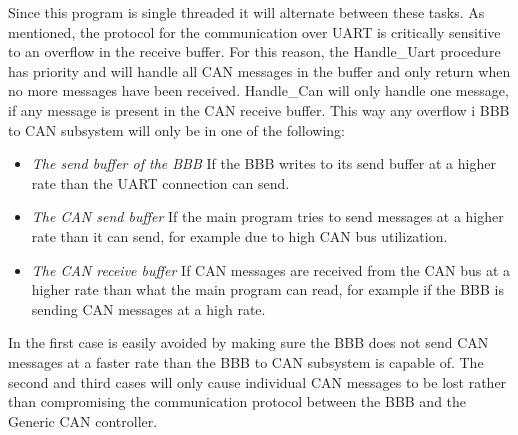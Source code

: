 Since this program is single threaded it will alternate between these tasks. \newline 
As mentioned, the protocol for the communication over UART is critically sensitive to an overflow in the receive buffer. For this reason, the Handle\_Uart procedure has priority and will handle all CAN messages in the buffer and only return when no more messages have been received. Handle\_Can will only handle one message, if any message is present in the CAN receive buffer. \newline
This way any overflow i BBB to CAN subsystem will only be in one of the following:

\begin{itemize}
   \item { \em The send buffer of the BBB} \newline
   If the BBB writes to its send buffer at a higher rate than the UART connection can send.
   \item { \em The CAN send buffer} \newline
   If the main program tries to send messages at a higher rate than it can send, for example due to high CAN bus utilization.
   \item { \em The CAN receive buffer} \newline
   If CAN messages are received from the CAN bus at a higher rate than what the main program can read, for example if the   BBB is sending CAN messages at a high rate.
\end{itemize}

In the first case is easily avoided by making sure the BBB does not send CAN messages at a faster rate than the BBB to CAN subsystem is capable of. The second and third cases will only cause individual CAN messages to be lost rather than compromising the communication protocol between the BBB and the Generic CAN controller.